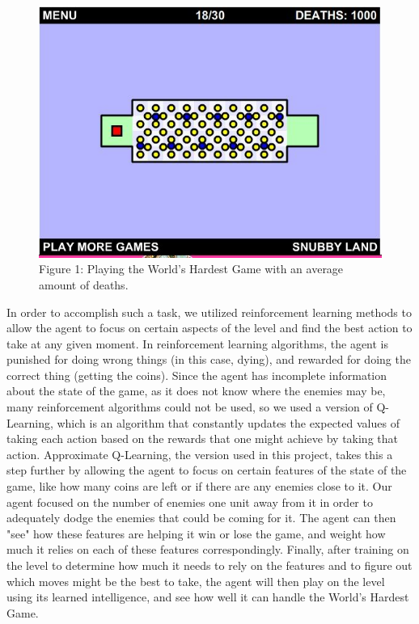 \documentclass[11pt]{article}
\begin{document}
\begin{figure}[h]
\centering

\includegraphics[scale = .5]{Hardgame4.jpg} \newline \newline
Figure 1: Playing the World's Hardest Game with an average amount of deaths.
\end{figure}

In order to accomplish such a task, we utilized reinforcement learning methods to allow the agent to focus on certain aspects of the level and find the best action to take at any given moment. In reinforcement learning algorithms, the agent is punished for doing wrong things (in this case, dying), and rewarded for doing the correct thing (getting the coins). Since the agent has incomplete information about the state of the game, as it does not know where the enemies may be, many reinforcement algorithms could not be used, so we used a version of Q-Learning, which is an algorithm that constantly updates the expected values of taking each action based on the rewards that one might achieve by taking that action. Approximate Q-Learning, the version used in this project, takes this a step further by allowing the agent to focus on certain features of the state of the game, like how many coins are left or if there are any enemies close to it. Our agent focused on the number of enemies one unit away from it in order to adequately dodge the enemies that could be coming for it. The agent can then "see" how these features are helping it win or lose the game, and weight how much it relies on each of these features correspondingly. Finally, after training on the level to determine how much it needs to rely on the features and to figure out which moves might be the best to take, the agent will then play on the level using its learned intelligence, and see how well it can handle the World's Hardest Game. 
\end{document}
